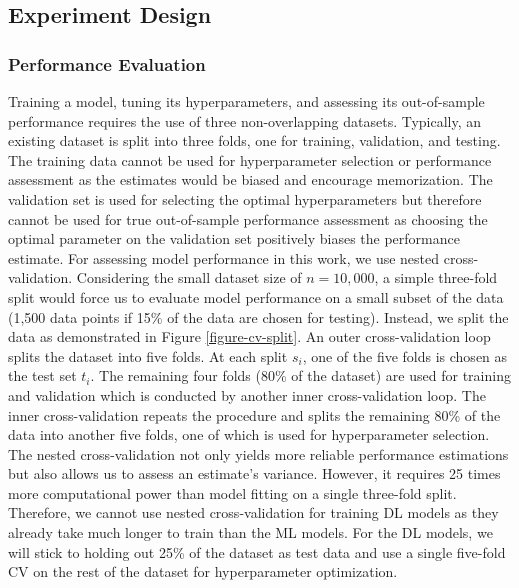 \subsection{Experiment Design}


\subsubsection{Performance Evaluation}
Training a model, tuning its hyperparameters, and assessing its out-of-sample performance requires the use of three non-overlapping datasets. Typically, an existing dataset is split into three folds, one for training, validation, and testing. The training data cannot be used for hyperparameter selection or performance assessment as the estimates would be biased and encourage memorization. The validation set is used for selecting the optimal hyperparameters but therefore cannot be used for true out-of-sample performance assessment as choosing the optimal parameter on the validation set positively biases the performance estimate.\newline
For assessing model performance in this work, we use nested cross-validation. Considering the small dataset size of $n=10,000$, a simple three-fold split would force us to evaluate model performance on a small subset of the data (1,500 data points if 15\% of the data are chosen for testing). Instead, we split the data as demonstrated in Figure \ref{figure-cv-split}. An outer cross-validation loop splits the dataset into five folds. At each split $s_i$, one of the five folds is chosen as the test set $t_i$. The remaining four folds (80\% of the dataset) are used for training and validation which is conducted by another inner cross-validation loop. The inner cross-validation repeats the procedure and splits the remaining 80\% of the data into another five folds, one of which is used for hyperparameter selection.\newline
The nested cross-validation not only yields more reliable performance estimations but also allows us to assess an estimate's variance. However, it requires 25 times more computational power than model fitting on a single three-fold split. Therefore, we cannot use nested cross-validation for training DL models as they already take much longer to train than the ML models. For the DL models, we will stick to holding out 25\% of the dataset as test data and use a single five-fold CV on the rest of the dataset for hyperparameter optimization.


